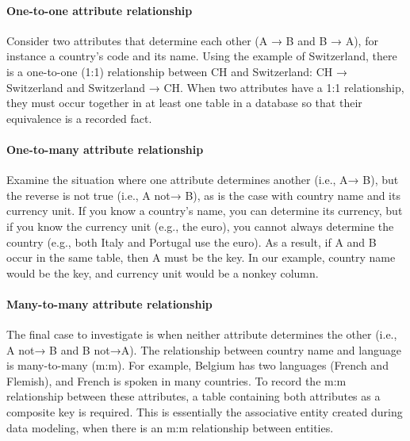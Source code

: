 \documentclass[
]{article}
\begin{document}
\hypertarget{one-to-one-attribute-relationship}{%
\paragraph*{One-to-one attribute relationship}\label{one-to-one-attribute-relationship}}

Consider two attributes that determine each other (A → B and B → A), for
instance a country's code and its name. Using the example of
Switzerland, there is a one-to-one (1:1) relationship between CH and
Switzerland: CH → Switzerland and Switzerland → CH. When two attributes
have a 1:1 relationship, they must occur together in at least one table
in a database so that their equivalence is a recorded fact.

\hypertarget{one-to-many-attribute-relationship}{%
\paragraph*{One-to-many attribute relationship}\label{one-to-many-attribute-relationship}}

Examine the situation where one attribute determines another (i.e., A→
B), but the reverse is not true (i.e., A not→ B), as is the case with
country name and its currency unit. If you know a country's name, you
can determine its currency, but if you know the currency unit (e.g., the
euro), you cannot always determine the country (e.g., both Italy and
Portugal use the euro). As a result, if A and B occur in the same table,
then A must be the key. In our example, country name would be the key,
and currency unit would be a nonkey column.

\hypertarget{many-to-many-attribute-relationship}{%
\paragraph*{Many-to-many attribute relationship}\label{many-to-many-attribute-relationship}}

The final case to investigate is when neither attribute determines the
other (i.e., A not→ B and B not→A). The relationship between country
name and language is many-to-many (m:m). For example, Belgium has two
languages (French and Flemish), and French is spoken in many countries.
To record the m:m relationship between these attributes, a table
containing both attributes as a composite key is required. This is
essentially the associative entity created during data modeling, when
there is an m:m relationship between entities.
\end{document}
